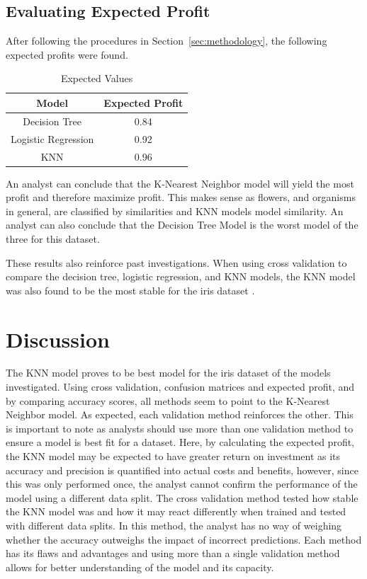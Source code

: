 \documentclass[journal]{IEEEtran}
\begin{document}
\subsection{Evaluating Expected Profit}

After following the procedures in Section~\ref{sec:methodology}, the following expected profits were found. 

\begin{table}[h!]
\centering
\begin{tabular}{ c | c }
Model & Expected Profit \\
\hline
Decision Tree & 0.84 \\
Logistic Regression & 0.92 \\
KNN & 0.96
\end{tabular}
\caption{Expected Values}
\label{table:exVals}
\end{table}

An analyst can conclude that the K-Nearest Neighbor model will yield the most profit and therefore maximize profit. This makes sense as flowers, and organisms in general, are classified by similarities and KNN models model similarity. An analyst can also conclude that the Decision Tree Model is the worst model of the three for this dataset.

These results also reinforce past investigations. When using cross validation to compare the decision tree, logistic regression, and KNN models, the KNN model was also found to be the most stable for the iris dataset \cite{b3}. 

\section{Discussion}
\label{sec:discussion}
The KNN model proves to be best model for the iris dataset of the models investigated. Using cross validation, confusion matrices and expected profit, and by comparing accuracy scores, all methods seem to point to the K-Nearest Neighbor model. As expected, each validation method reinforces the other. This is important to note as analysts should use more than one validation method to ensure a model is best fit for a dataset. Here, by calculating the expected profit, the KNN model may be expected to have greater return on investment as its accuracy and precision is quantified into actual costs and benefits, however, since this was only performed once, the analyst cannot confirm the performance of the model using a different data split. The cross validation method tested how stable the KNN model was and how it may react differently when trained and tested with different data splits. In this method, the analyst has no way of weighing whether the accuracy outweighs the impact of incorrect predictions. Each method has its flaws and advantages and using more than a single validation method allows for better understanding of the model and its capacity.
\end{document}

